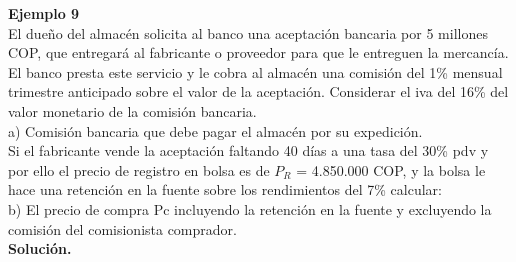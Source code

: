 \newpage
\textbf{Ejemplo 9}\\
El dueño del almacén solicita al banco una aceptación bancaria por 5 millones COP, que
entregará al fabricante o proveedor para que le entreguen la mercancía. El banco presta
este servicio y le cobra al almacén una comisión del 1\% mensual trimestre anticipado sobre
el valor de la aceptación. Considerar el iva del 16\% del valor monetario de la comisión
bancaria.\\
a) Comisión bancaria que debe pagar el almacén por su expedición.\\
Si el fabricante vende la aceptación faltando 40 días a una tasa del 30\% pdv y por ello el
precio de registro en bolsa es de $P_{R}$ = 4.850.000 COP, y la bolsa le hace una retención en la fuente sobre los rendimientos del 7\% calcular: \\
b) El precio de compra Pc incluyendo la retención en la fuente y excluyendo la comisión
del comisionista comprador. \\ 
\textbf{Solución.}
